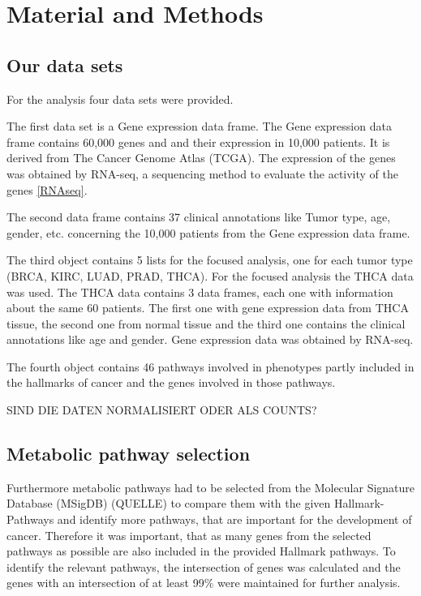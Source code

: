 \documentclass[
]{article}
\author{}
\date{\vspace{-2.5em}}
\begin{document}
\hypertarget{material-and-methods}{%
\section{Material and Methods}\label{material-and-methods}}

\hypertarget{our-data-sets}{%
\subsection{Our data sets}\label{our-data-sets}}

For the analysis four data sets were provided.

The first data set is a Gene expression data frame. The Gene expression
data frame contains 60,000 genes and and their expression in 10,000
patients. It is derived from The Cancer Genome Atlas (TCGA). The
expression of the genes was obtained by RNA-seq, a sequencing method to
evaluate the activity of the genes \ref{RNAseq}.

The second data frame contains 37 clinical annotations like Tumor type,
age, gender, etc. concerning the 10,000 patients from the Gene
expression data frame.

The third object contains 5 lists for the focused analysis, one for each
tumor type (BRCA, KIRC, LUAD, PRAD, THCA). For the focused analysis the
THCA data was used. The THCA data contains 3 data frames, each one with
information about the same 60 patients. The first one with gene
expression data from THCA tissue, the second one from normal tissue and
the third one contains the clinical annotations like age and gender.
Gene expression data was obtained by RNA-seq.

The fourth object contains 46 pathways involved in phenotypes partly
included in the hallmarks of cancer and the genes involved in those
pathways.

SIND DIE DATEN NORMALISIERT ODER ALS COUNTS?

\hypertarget{metabolic-pathway-selection}{%
\subsection{Metabolic pathway
selection}\label{metabolic-pathway-selection}}

Furthermore metabolic pathways had to be selected from the Molecular
Signature Database (MSigDB) (QUELLE) to compare them with the given
Hallmark-Pathways and identify more pathways, that are important for the
development of cancer. Therefore it was important, that as many genes
from the selected pathways as possible are also included in the provided
Hallmark pathways. To identify the relevant pathways, the intersection
of genes was calculated and the genes with an intersection of at least
99\% were maintained for further analysis.
\end{document}
